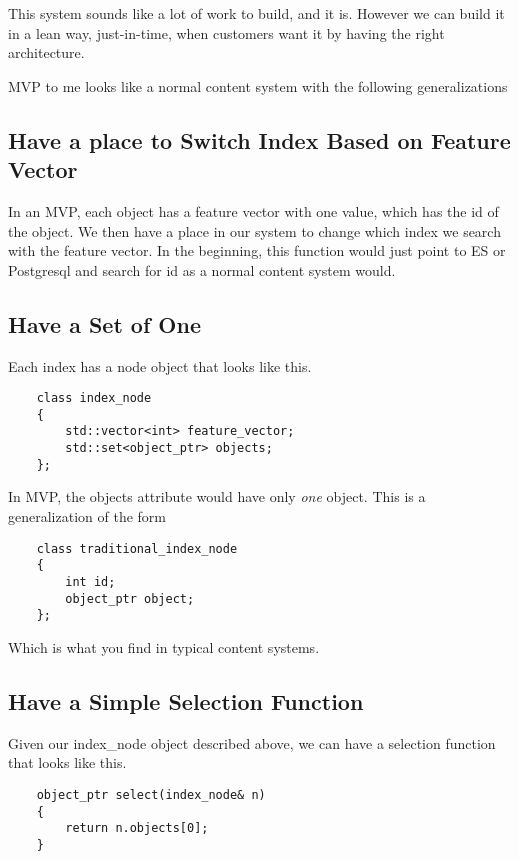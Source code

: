 \documentclass[11pt]{article}
\begin{document}
This system sounds like a lot of work to build, and it is. However we can build it
in a lean way, just-in-time, when customers want it by having the right architecture.

MVP to me looks like a normal content system with the following generalizations

\subsection{Have a place to Switch Index Based on Feature Vector}

In an MVP, each object has a feature vector with one value, which has the id of the object.
We then have a place in our system to change which index we search with the feature vector.  
In the beginning, this function would just point to ES or Postgresql and search
for id as a normal content system would.

\subsection{Have a Set of One}

Each index has a node object that looks like this.

\begin{lstlisting}
    class index_node
    {
        std::vector<int> feature_vector;
        std::set<object_ptr> objects;
    };
\end{lstlisting}

In MVP, the objects attribute would have only \emph{one} object. This is a generalization of the form

\begin{lstlisting}
    class traditional_index_node
    {
        int id;
        object_ptr object;
    };
\end{lstlisting}

Which is what you find in typical content systems.

\subsection{Have a Simple Selection Function}

Given our index\_node object described above, we can have a selection function
that looks like this.

\begin{lstlisting}
    object_ptr select(index_node& n) 
    {
        return n.objects[0];
    }
\end{lstlisting}
\end{document}
